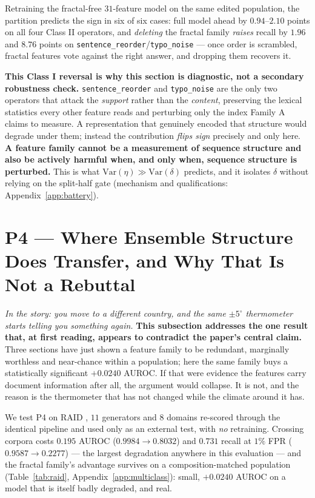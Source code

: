 \documentclass{article}
\begin{document}
Retraining the fractal-free $31$-feature model on the same edited population,
the partition predicts the sign in six of six cases: full model ahead by
$0.94$--$2.10$ points on all four Class II operators, and \emph{deleting} the
fractal family \emph{raises} recall by $1.96$ and $8.76$ points on
\texttt{sentence\_reorder}/\texttt{typo\_noise} --- once order is scrambled,
fractal features vote against the right answer, and dropping them recovers
it.

\textbf{This Class I reversal is why this section is diagnostic, not a
secondary robustness check.}
\texttt{sentence\_reorder} and \texttt{typo\_noise} are the only two operators
that attack the \emph{support} rather than the \emph{content}, preserving the
lexical statistics every other feature reads and perturbing only the index
Family A claims to measure. A representation that genuinely encoded that
structure would degrade under them; instead the contribution \emph{flips
sign} precisely and only here. \textbf{A feature family cannot be a
measurement of sequence structure and also be actively harmful when, and only
when, sequence structure is perturbed.} This is what
$\mathrm{Var}(\eta)\gg\mathrm{Var}(\delta)$ predicts, and it isolates $\delta$
without relying on the split-half gate (mechanism and qualifications:
Appendix~\ref{app:battery}).

\section{P4 --- Where Ensemble Structure Does Transfer, and Why That Is Not a Rebuttal}
\label{sec:transfer}

\emph{In the story: you move to a different country, and the same $\pm5^\circ$
thermometer starts telling you something again.} \textbf{This subsection
addresses the one result that, at first reading, appears to contradict the
paper's central claim.} Three sections have just shown a feature family to be
redundant, marginally worthless and near-chance within a population; here the
same family buys a statistically significant $+0.0240$ AUROC. If that were
evidence the features carry document information after all, the argument
would collapse. It is not, and the reason is the thermometer that has not
changed while the climate around it has.

We test P4 on RAID \citep{dugan2024raid}, $11$ generators and $8$ domains
re-scored through the identical pipeline and used only as an external test,
with \emph{no} retraining. Crossing corpora costs $0.195$ AUROC
($0.9984\!\to\!0.8032$) and $0.731$ recall at $1\%$ FPR
($0.9587\!\to\!0.2277$) --- the largest degradation anywhere in this
evaluation --- and the fractal family's advantage survives on a
composition-matched population (Table~\ref{tab:raid}, Appendix~\ref{app:multiclass}):
small, $+0.0240$ AUROC on a model that is itself badly degraded, and real.
\end{document}
